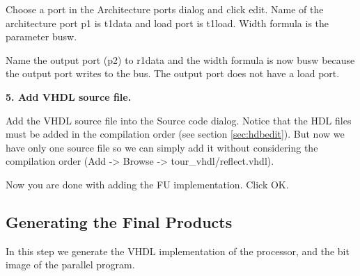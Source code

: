 \documentclass[twoside]{tceusermanual}
\begin{document}
\begin{enumerate}
Choose a port in the Architecture ports dialog and click edit.
Name of the architecture port p1 is t1data and load port is t1load.
Width formula is the parameter busw.

Name the output port (p2) to r1data and the width formula is now busw
because the output port writes to the bus.
The output port does not have a load port.

\textbf{5. Add VHDL source file.}

Add the VHDL source file into the Source code dialog. Notice that the HDL
files must be added in the compilation order (see section \ref{sec:hdbedit}).
But now we have only one source file so we can simply add it without
considering the compilation order (Add -> Browse -> tour\_vhdl/reflect.vhdl).

Now you are done with adding the FU implementation. Click OK.

\end{enumerate}

\subsection{Generating the Final Products}
\label{ssec:tcetour_final_products}

In this step we generate the VHDL implementation of the processor, and the
bit image of the parallel program.

% 
% 
% 
% 
% 
% 
% 
% 
% 
% 
% 
% 
% 
\end{document}
